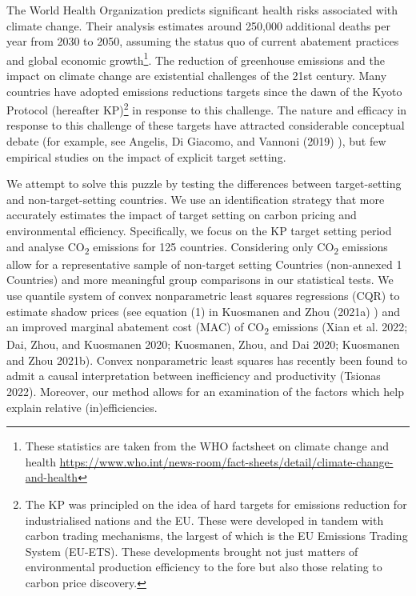 \documentclass[
  letterpaper,
  DIV=11,
  numbers=noendperiod]{scrartcl}
\begin{document}
The World Health Organization predicts significant health risks
associated with climate change. Their analysis estimates around 250,000
additional deaths per year from 2030 to 2050, assuming the status quo of
current abatement practices and global economic growth\footnote{These
  statistics are taken from the WHO factsheet on climate change and
  health
  \url{https://www.who.int/news-room/fact-sheets/detail/climate-change-and-health}}.
The reduction of greenhouse emissions and the impact on climate change
are existential challenges of the 21st century. Many countries have
adopted emissions reductions targets since the dawn of the Kyoto
Protocol (hereafter KP)\footnote{The KP was principled on the idea of
  hard targets for emissions reduction for industrialised nations and
  the EU. These were developed in tandem with carbon trading mechanisms,
  the largest of which is the EU Emissions Trading System (EU-ETS).
  These developments brought not just matters of environmental
  production efficiency to the fore but also those relating to carbon
  price discovery.} in response to this challenge. The nature and
efficacy in response to this challenge of these targets have attracted
considerable conceptual debate (for example, see Angelis, Di Giacomo,
and Vannoni (2019) ), but few empirical studies on the impact of
explicit target setting.

We attempt to solve this puzzle by testing the differences between
target-setting and non-target-setting countries. We use an
identification strategy that more accurately estimates the impact of
target setting on carbon pricing and environmental efficiency.
Specifically, we focus on the KP target setting period and analyse
CO\textsubscript{2} emissions for 125 countries. Considering only
CO\textsubscript{2} emissions allow for a representative sample of
non-target setting Countries (non-annexed 1 Countries) and more
meaningful group comparisons in our statistical tests. We use quantile
system of convex nonparametric least squares regressions (CQR) to
estimate shadow prices (see equation (1) in Kuosmanen and Zhou (2021a) )
and an improved marginal abatement cost (MAC) of CO\textsubscript{2}
emissions (Xian et al. 2022; Dai, Zhou, and Kuosmanen 2020; Kuosmanen,
Zhou, and Dai 2020; Kuosmanen and Zhou 2021b). Convex nonparametric
least squares has recently been found to admit a causal interpretation
between inefficiency and productivity (Tsionas 2022). Moreover, our
method allows for an examination of the factors which help explain
relative (in)efficiencies.
\end{document}
